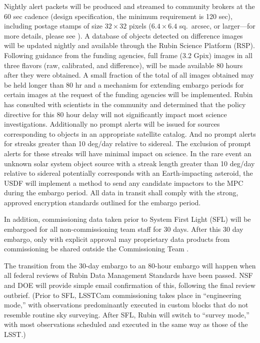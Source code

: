 Nightly alert packets will be produced and streamed to community brokers at the 60 sec cadence (design specification, the minimum requirement is 120 sec), including postage stamps of size $32 \times 32$ pixels ($6.4 \times 6.4$ sq.\ \gls{arcsec}, or larger---for more details, please see ).
A database of objects detected on difference images will be updated nightly and available through the Rubin Science Platform (\gls{RSP}).
Following guidance from the funding agencies, full frame (3.2 Gpix) images in all three flavors (raw, calibrated, and difference), will be made available 80 hours after they were obtained.
A small fraction of the total of all images obtained may be held longer than 80 hr and a mechanism for extending embargo periods for certain images at the request of the funding agencies will be implemented.
Rubin has consulted with scientists in the community and determined that the policy directive for this 80 hour delay will not significantly impact most science investigations.
Additionally no prompt alerts will be issued for sources corresponding to objects in an appropriate satellite catalog.
And no prompt alerts for streaks greater than 10 \gls{deg}/day relative to sidereal.
The exclusion of prompt alerts for these streaks will have minimal impact on science.
In the rare event an unknown solar system object source with a streak length greater than 10 \gls{deg}/day relative to sidereal potentially corresponds with an Earth-impacting asteroid, the \gls{USDF} will implement a method to send any candidate impactors to the \gls{MPC} during the embargo period.
All data in transit shall comply with the strong, approved encryption standards outlined for the embargo period.

In addition, commissioning data taken prior to System First Light (SFL) will be embargoed for all non-commissioning team staff for 30 days.
After this 30 day embargo, only with explicit approval may proprietary data products from commissioning be shared outside the \gls{Commissioning} Team  .

The transition from the 30-day embargo to an 80-hour embargo will happen when all federal reviews of Rubin Data Management Standards have been passed. 
NSF and DOE will provide simple email confirmation of this, following the final review outbrief.
(Prior to SFL, LSSTCam commissioning takes place in ``engineering mode,'' with observations predominantly executed in custom blocks that do not resemble routine sky surveying. 
After SFL, Rubin will switch to ``survey mode,'' with most observations scheduled and executed in the same way as those of the LSST.)  

